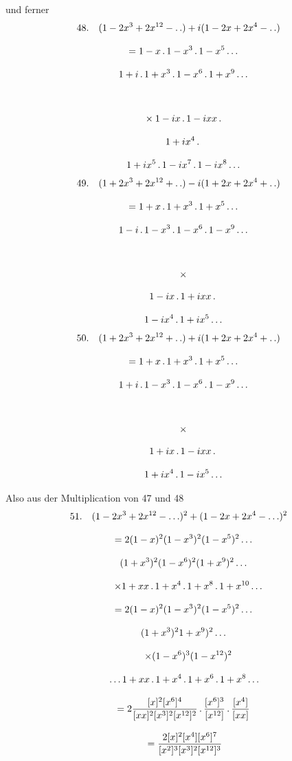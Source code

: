 \par {}


und ferner
\[
\begin{gathered}
48.\quad{}
(1-2x^3+2x^{12}- .\,. )+i(1-2x+2x^4- .\,. )\\[8pt]
\quad=1-x\,.\,1-x^3\,.\,1-x^5\mathinner{.\,.\,.} \\[8pt]\quad{}1+i\,.\,1+x^3\,.\,1-x^6\,.\,1+x^9\mathinner{.\,.\,.}\\[8pt]
\qquad\\[8pt]\quad{}\times1-ix\,.\,1-ixx\,.\,\\[8pt]\quad{}1+ix^4\,.\,\\[8pt]\quad{}1+ix^5\,.\,1-ix^7\,.\,1-ix^8\mathinner{.\,.\,.}
\end{gathered}
\]
\[
\begin{gathered}
49.\quad{}
(1+2x^3+2x^{12}+ .\,. )-i(1+2x+2x^4+ .\,. )\\[8pt]
\quad=1+x\,.\,1+x^3\,.\,1+x^5\mathinner{.\,.\,.} \\[8pt]\quad{}1-i\,.\,1-x^3\,.\,1-x^6\,.\,1-x^9\mathinner{.\,.\,.}\\[8pt]
\qquad\\[8pt]\quad{}\times\\[8pt]\quad{}1-ix\,.\,1+ixx\,.\,\\[8pt]\quad{}1-ix^4\,.\,1+ix^5\mathinner{.\,.\,.}
\end{gathered}
\]
\[
\begin{gathered}
50.\quad{}
(1+2x^3+2x^{12}+ .\,. )+i(1+2x+2x^4+ .\,. )\\[8pt]
\quad=1+x\,.\,1+x^3\,.\,1+x^5\mathinner{.\,.\,.} \\[8pt]\quad{}1+i\,.\,1-x^3\,.\,1-x^6\,.\,1-x^9\mathinner{.\,.\,.}\\[8pt]
\qquad\\[8pt]\quad{}\times\\[8pt]\quad{}1+ix\,.\,1-ixx\,.\,\\[8pt]\quad{}1+ix^4\,.\,1-ix^5\mathinner{.\,.\,.}
\end{gathered}
\]

Also aus der Multiplication von 47 und 48
\[
\begin{gathered}
51.\quad{}
(1-2x^3+2x^{12}-\mathinner{.\,.\,.})^2+(1-2x+2x^4-\mathinner{.\,.\,.})^2\\[8pt]
\quad=2(1-x)^2(1-x^3)^2(1-x^5)^2\mathinner{.\,.\,.}\\[8pt]\quad{}(1+x^3)^2(1-x^6)^2(1+x^9)^2\mathinner{.\,.\,.}\\[8pt]
\qquad\times1+xx\,.\,1+x^4\,.\,1+x^8\,.\,1+x^{10}\mathinner{.\,.\,.}\\[8pt]
\quad=2(1-x)^2(1-x^3)^2(1-x^5)^2\mathinner{.\,.\,.}\\[8pt]\quad{}(1+x^3)^2 1+x^9)^2\mathinner{.\,.\,.}\\[8pt]
\qquad\times(1-x^6)^3(1-x^{12})^2\\[8pt]\quad{}\mathinner{.\,.\,.} 1+xx\,.\,1+x^4\,.\,1+x^6\,.\,1+x^8\mathinner{.\,.\,.}\\[8pt]
\quad=2\frac{[x]^2[x^6]^4}{[xx]^2[x^3]^2[x^{12}]^2}\,.\,\frac{[x^6]^3}{[x^{12}]}\,.\,\frac{[x^4]}{[xx]}
\\[8pt]\quad{}=\frac{2[x]^2[x^4][x^6]^7}{[x^2]^3[x^3]^2[x^{12}]^3}
\end{gathered}
\]

